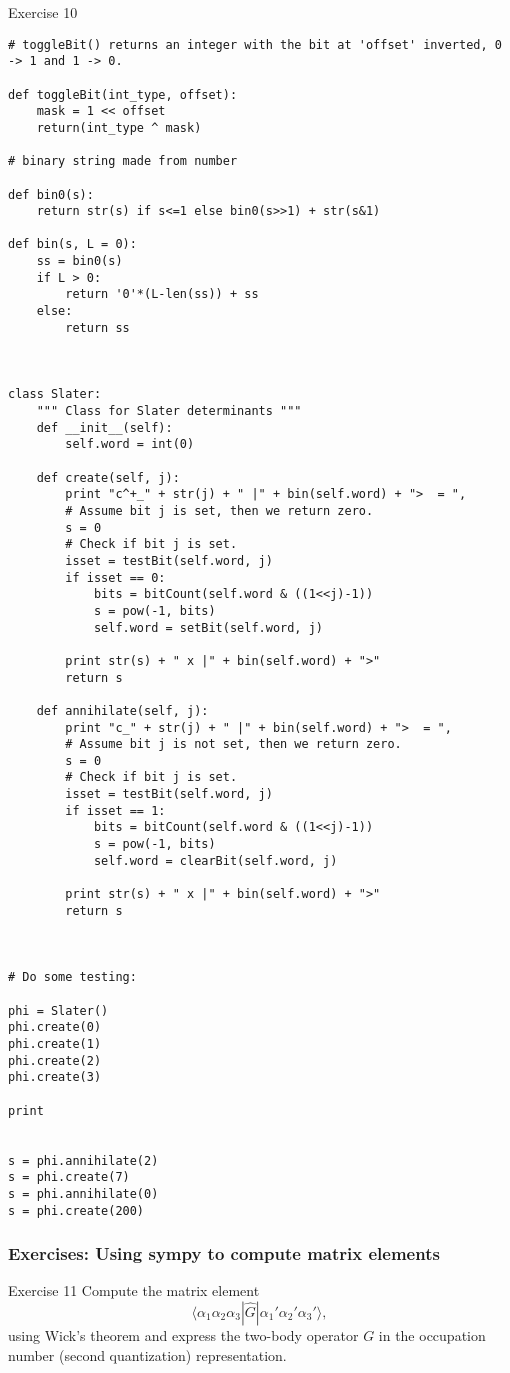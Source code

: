 \documentclass{beamer}
\begin{document}
\begin{frame}
\begin{block}{Exercise 10 }
\begin{verbatim}
# toggleBit() returns an integer with the bit at 'offset' inverted, 0 -> 1 and 1 -> 0.

def toggleBit(int_type, offset):
    mask = 1 << offset
    return(int_type ^ mask)

# binary string made from number

def bin0(s):
    return str(s) if s<=1 else bin0(s>>1) + str(s&1)

def bin(s, L = 0):
    ss = bin0(s)
    if L > 0:
        return '0'*(L-len(ss)) + ss
    else:
        return ss
    
    

class Slater:
    """ Class for Slater determinants """
    def __init__(self):
        self.word = int(0)

    def create(self, j):
        print "c^+_" + str(j) + " |" + bin(self.word) + ">  = ",
        # Assume bit j is set, then we return zero.
        s = 0
        # Check if bit j is set.
        isset = testBit(self.word, j)
        if isset == 0:
            bits = bitCount(self.word & ((1<<j)-1))
            s = pow(-1, bits)
            self.word = setBit(self.word, j)

        print str(s) + " x |" + bin(self.word) + ">"
        return s
        
    def annihilate(self, j):
        print "c_" + str(j) + " |" + bin(self.word) + ">  = ",
        # Assume bit j is not set, then we return zero.
        s = 0
        # Check if bit j is set.
        isset = testBit(self.word, j)
        if isset == 1:
            bits = bitCount(self.word & ((1<<j)-1))
            s = pow(-1, bits)
            self.word = clearBit(self.word, j)

        print str(s) + " x |" + bin(self.word) + ">"
        return s



# Do some testing:

phi = Slater()
phi.create(0)
phi.create(1)
phi.create(2)
phi.create(3)

print


s = phi.annihilate(2)
s = phi.create(7)
s = phi.annihilate(0)
s = phi.create(200)

\end{verbatim}
\end{block}
\end{frame}

\begin{frame}
\frametitle{Exercises: Using sympy to compute matrix elements}

\begin{block}{Exercise 11 }
Compute the matrix element
\[
\langle\alpha_{1}\alpha_{2}\alpha_{3}|\hat{G}|\alpha_{1}'\alpha_{2}'\alpha_{3}'\rangle,
\]
using Wick's theorem and express the two-body operator
$G$ in the occupation number (second quantization) 
representation.

\end{block}
\end{frame}
\end{document}
